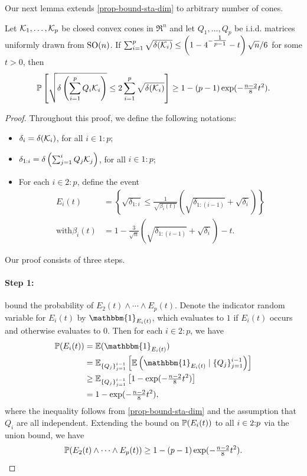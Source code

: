 Our next lemma extends \autoref{prop-bound-sta-dim} to arbitrary number of cones. 
\begin{lemma} \label{prop:bound-sum-sta-dim}
   Let $\mathcal{K}_1, \dots, \mathcal{K}_p$ be closed convex cones in $\Re^n$ and let $Q_1, \dots, Q_p$ be i.i.d. matrices uniformly drawn from $\operatorname{SO}(n)$. If $\sum_{i=1}^p \sqrt{\delta(\mathcal{K}_i)} \leq \left(1 - 4^{- \tfrac{1}{p-1} } - t\right)\sqrt{n} / 6$ for some $t > 0$, then 
   \begin{equation*}
   \mathbb{P}\left[ \sqrt{\delta\left(\sum_{i=1}^pQ_i\mathcal{K}_i\right)} \leq 2\sum_{i=1}^p \sqrt{\delta(\mathcal{K}_i)}\right] \geq 1 - (p-1)\exp(-\tfrac{n-2}{8}t^2).
   \end{equation*}
\end{lemma}

\begin{proof}
    Throughout this proof, we define the following notations:
    \begin{itemize}
      \item $\delta_i = \delta(\mathcal{K}_i)$, for all $i\in1:p$;
      \item $\delta_{1:i} = \delta\left(\sum_{j=1}^iQ_j\mathcal{K}_j\right)$, for all $i\in1:p$;
      \item For each $i\in2:p$, define the event 
    \begin{align*}
      E_i(t) &= \left\{ \sqrt{\delta_{1:i}} \leq \tfrac{1}{\sqrt{\beta_i(t)}} \left( \sqrt{\delta_{1:(i-1)}} + \sqrt{\delta_i}\right)\right\}
      \\\text{with} \beta_i(t) &= 1 - \tfrac{3}{\sqrt{n}}\left( \sqrt{\delta_{1:(i-1)}} + \sqrt{\delta_i}\right) - t.
    \end{align*}
    \end{itemize}
    
    Our proof consists of three steps.
    
    \paragraph{Step 1:} bound the probability of $E_2(t)\land\cdots\land E_p(t)$.
    Denote the indicator random variable for $E_i(t)$ by $\mathbbm{1}_{E_i(t)}$, which evaluates to $1$ if $E_i(t)$ occurs and otherwise evaluates to $0$. Then for each $i\in2:p$, we have
    \begin{align*}
      \mP(E_i(t)) &= \mE(\mathbbm{1}_{E_i(t)})
      \\&= \mE_{\{Q_j\}_{j=1}^{i-1}} \left[ \mE\left(\mathbbm{1}_{E_i(t)} \mid \{Q_j\}_{j=1}^{i-1}\right)\right]
      \\&\geq \mE_{\{Q_j\}_{j=1}^{i-1}} \left[ 1 - \exp(-\tfrac{n-2}{8}t^2) \right]
      \\&= 1 - \exp(-\tfrac{n-2}{8}t^2),
    \end{align*}
    where the inequality follows from \autoref{prop-bound-sta-dim} and the assumption that $Q_i$ are all independent. Extending the bound on $\mathbb{P}(E_i(t))$ to all $i\in2\mathord{:}p$ via the union bound, we have
    \[
      \mathbb{P}(E_2(t) \land\cdots\land E_p(t))
      \geq 1 - (p-1)\exp(-\tfrac{n-2}{8}t^2).\]
    

\end{proof}
